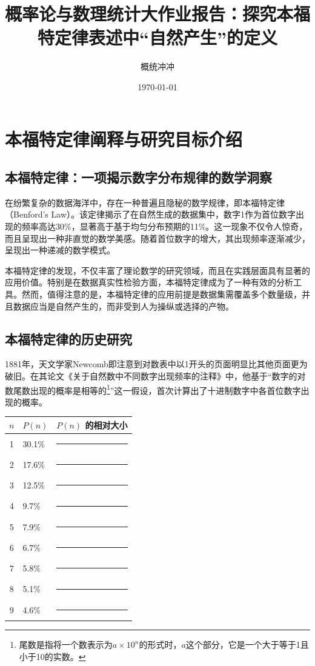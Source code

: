\documentclass{ctexart} %
\begin{document}
\title{概率论与数理统计大作业报告：探究本福特定律表述中“自然产生”的定义}
\author{概统冲冲}
\date{\today}
\maketitle

\section{本福特定律阐释与研究目标介绍}

\subsection{本福特定律：一项揭示数字分布规律的数学洞察}

在纷繁复杂的数据海洋中，存在一种普遍且隐秘的数学规律，即本福特定律（Benford’s Law）。该定律揭示了在自然生成的数据集中，数字1作为首位数字出现的频率高达30\%，显著高于基于均匀分布预期的11\%。这一现象不仅令人惊奇，而且呈现出一种非直觉的数学美感。随着首位数字的增大，其出现频率逐渐减少，呈现出一种递减的数学模式。

本福特定律的发现，不仅丰富了理论数学的研究领域，而且在实践层面具有显著的应用价值。特别是在数据真实性检验方面，本福特定律成为了一种有效的分析工具。然而，值得注意的是，本福特定律的应用前提是数据集需覆盖多个数量级，并且数据应当是自然产生的，而非受到人为操纵或选择的产物\cite{wiki_benford}。

\subsection{本福特定律的历史研究}

1881年，天文学家Newcomb即注意到对数表中以1开头的页面明显比其他页面更为破旧。在其论文《关于自然数中不同数字出现频率的注释》中，他基于“数字的对数尾数出现的概率是相等的\footnote{尾数是指将一个数表示为$a\times10^n$的形式时，$a$这个部分，它是一个大于等于1且小于10的实数。}”这一假设，首次计算出了十进制数字中各首位数字出现的概率。\cite{Simon}

\begin{tabular}{|c|p{3cm}|p{6cm}|}
    \hline
    $n$ & $P(n)$ & $P(n)$ 的相对大小   \\
    \hline
    1 & 30.1\% & \rule{4.8cm}{0.2cm} \\ \hline
    2 & 17.6\% & \rule{2.9cm}{0.2cm} \\ \hline
    3 & 12.5\% & \rule{2.1cm}{0.2cm} \\ \hline
    4 & 9.7\% & \rule{1.6cm}{0.2cm} \\ \hline
    5 & 7.9\% & \rule{1.3cm}{0.2cm} \\ \hline
    6 & 6.7\% & \rule{1.1cm}{0.2cm} \\ \hline
    7 & 5.8\% & \rule{0.95cm}{0.2cm} \\ \hline
    8 & 5.1\% & \rule{0.85cm}{0.2cm} \\ \hline
    9 & 4.6\% & \rule{0.75cm}{0.2cm} \\ \hline
\end{tabular}
\end{document}
